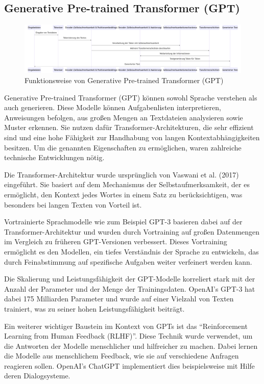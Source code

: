 \documentclass[conference]{IEEEtran}
\begin{document}
\subsection{Generative Pre-trained Transformer (GPT)}

\begin{figure}[!htbp]
    \centering
    \includegraphics[width=1.0\textwidth]{gpt.png}
    \caption{Funktionsweise von Generative Pre-trained Transformer (GPT)\cite{yenduri_gpt_2024}}
    \label{fig:enter-label}
\end{figure}

Generative Pre-trained Transformer (GPT) können sowohl Sprache verstehen als auch generieren. Diese Modelle können Aufgabenlisten interpretieren, Anweisungen befolgen, aus großen Mengen an Textdateien analysieren sowie Muster erkennen. Sie nutzen dafür Transformer-Architekturen, die sehr effizient sind und eine hohe Fähigkeit zur Handhabung von langen Kontextabhängigkeiten besitzen. Um die genannten Eigenschaften zu ermöglichen, waren zahlreiche technische Entwicklungen nötig.

Die Transformer-Architektur wurde ursprünglich von Vaswani et al. (2017) eingeführt. Sie basiert auf dem Mechanismus der Selbstaufmerksamkeit, der es ermöglicht, den Kontext jedes Wortes in einem Satz zu berücksichtigen, was besonders bei langen Texten von Vorteil ist\cite{brown_language_2020}.

Vortrainierte Sprachmodelle wie zum Beispiel GPT-3 basieren dabei auf der Transformer-Architektur und wurden durch Vortraining auf großen Datenmengen im Vergleich zu früheren GPT-Versionen verbessert. Dieses Vortraining ermöglicht es den Modellen, ein tiefes Verständnis der Sprache zu entwickeln, das durch Feinabstimmung auf spezifische Aufgaben weiter verfeinert werden kann.

Die Skalierung und Leistungsfähigkeit der GPT-Modelle korreliert stark mit der Anzahl der Parameter und der Menge der Trainingsdaten. OpenAI's GPT-3 hat dabei 175 Milliarden Parameter und wurde auf einer Vielzahl von Texten trainiert, was zu seiner hohen Leistungsfähigkeit beiträgt\cite{vaswani_attention_2023}.

Ein weiterer wichtiger Baustein im Kontext von GPTs ist das “Reinforcement Learning from Human Feedback (RLHF)”. Diese Technik wurde verwendet, um die Antworten der Modelle menschlicher und hilfreicher zu machen. Dabei lernen die Modelle aus menschlichem Feedback, wie sie auf verschiedene Anfragen reagieren sollen. OpenAI’s ChatGPT implementiert dies beispielsweise mit Hilfe deren Dialogsysteme.
\end{document}
